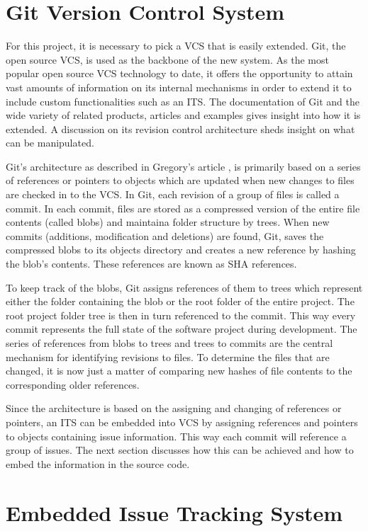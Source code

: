 \documentclass{mproj}
\begin{document}
\section{Git Version Control System}

For this project, it is necessary to pick a VCS that is easily extended. Git, the open source VCS, is used as the backbone of the new system. As the most popular open source VCS technology to date, it offers the opportunity to attain vast amounts of information on its internal mechanisms in order to extend it to include custom functionalities such as an ITS. The documentation of Git and the wide variety of related products, articles and examples gives insight into how it is extended. A discussion on its revision control architecture sheds insight on what can be manipulated.

Git’s architecture as described in Gregory's article \cite{BehindGit}, is primarily based on a series of references or pointers to objects which are updated when new changes to files are checked in to the VCS. In Git, each revision of a group of files is called a commit. In each commit, files are stored as a compressed version of the entire file contents (called blobs) and maintaina folder structure by trees. When new commits (additions, modification and deletions) are found, Git, saves the compressed blobs to its objects directory and creates a new reference by hashing the blob’s contents. These references are known as SHA references.

To keep track of the blobs, Git assigns references of them to trees which represent either the folder containing the blob or the root folder of the entire project. The root project folder tree is then in turn referenced to the commit. This way every commit represents the full state of the software project during development. The series of references from blobs to trees and trees to commits are the central mechanism for identifying revisions to files. To determine the files that are changed, it is now just a matter of comparing new hashes of file contents to the corresponding older references.

Since the architecture is based on the assigning and changing of references or pointers, an ITS can be embedded into VCS by assigning references and pointers to objects containing issue information. This way each commit will reference a group of issues. The next section discusses how this can be achieved and how to embed the information in the source code.


\section{Embedded Issue Tracking System}
\end{document}
